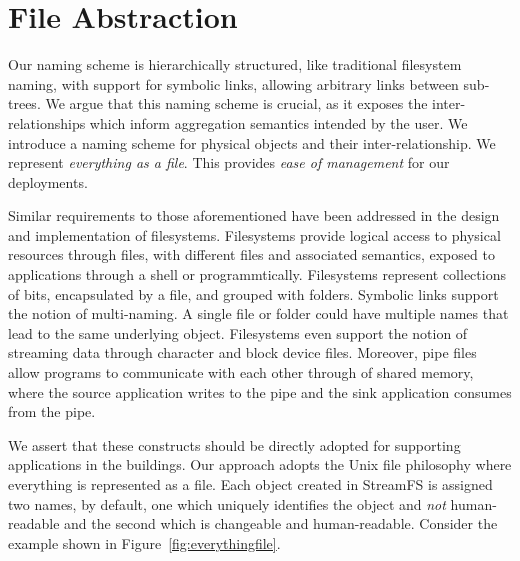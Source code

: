 \section{File Abstraction}

Our naming scheme is hierarchically structured, like traditional filesystem naming, with support
for symbolic links, allowing arbitrary links between sub-trees.  We argue that this naming scheme
is crucial, as it exposes the inter-relationships which inform aggregation semantics intended
by the user.  We introduce a naming scheme for physical objects and their inter-relationship.
We represent \emph{everything as a file}.  This provides \emph{ease of management} for our deployments.




Similar requirements to those aforementioned have been addressed in the design and implementation of filesystems.  Filesystems provide
logical access to physical resources through files, with different files and associated semantics, exposed to applications through a shell
or programmtically.  Filesystems represent collections of bits, encapsulated by a file, and grouped with folders.  Symbolic links support
the notion of multi-naming.  A single file or folder could have multiple names that lead to the same underlying object.  Filesystems even
support the notion of streaming data through character and block device files.  Moreover, pipe files allow programs to communicate with each
other through of shared memory, where the source application writes to the pipe and the sink application consumes from the pipe.

We assert that these constructs should be directly adopted for supporting applications in the buildings.  Our approach adopts the Unix
file philosophy where everything is represented as a file.  Each object created in StreamFS is assigned two names, by default, one which 
uniquely identifies the object and \emph{not} human-readable and the second which is changeable and human-readable.  Consider
the example shown in Figure~\ref{fig:everythingfile}.


